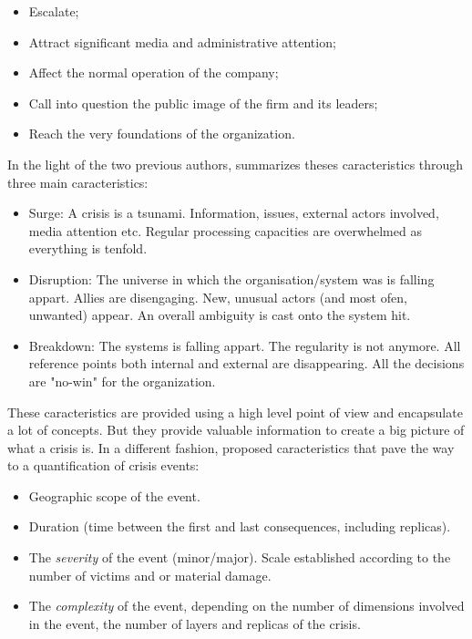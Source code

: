 \begin{itemize}
    \item Escalate;
    \item Attract significant media and administrative attention;
    \item Affect the normal operation of the company;
    \item Call into question the public image of the firm and its leaders;
    \item Reach the very foundations of the organization.
\end{itemize}

In the light of the two previous authors, \cite{lagadecGESTIONCRISES1994} summarizes theses caracteristics through three main caracteristics:

\begin{itemize}
    \item Surge: A crisis is a tsunami. Information, issues, external actors involved, media attention etc.
          Regular processing capacities are overwhelmed as everything is tenfold.
    \item Disruption: The universe in which the organisation/system was is falling appart. Allies are disengaging. New, unusual actors (and most ofen, unwanted) appear.
          An overall ambiguity is cast onto the system hit.
    \item Breakdown: The systems is falling appart. The regularity is not anymore. All reference points both internal and external are disappearing.
          All the decisions are "no-win" for the organization.
\end{itemize}

These caracteristics are provided using a high level point of view and encapsulate a lot of concepts.
But they provide valuable information to create a big picture of what a crisis is.
In a different fashion, \cite{fertierInterpretationAutomatiqueDonnees2018a} proposed caracteristics that pave the way to a quantification of crisis events:

\begin{itemize}
    \item Geographic scope of the event.
    \item Duration (time between the first and last consequences, including replicas).
    \item The \emph{severity} of the event (minor/major). Scale established according to the number of victims and or material damage.
    \item The \emph{complexity} of the event, depending on the number of dimensions involved in the event, the number of layers and replicas of the crisis.
\end{itemize}

